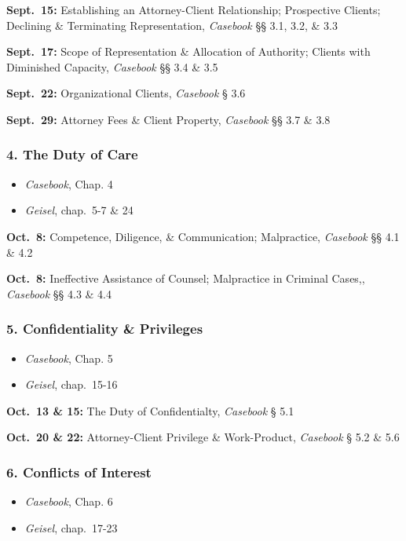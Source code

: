\documentclass[11pt,letterpaper,twoside]{article}
\providecommand{\tightlist}{%
\setlength{\itemsep}{0em}\setlength{\parskip}{0em}\setlength{\itemindent}{0em}}
\begin{document}
\textbf{Sept.~15:} Establishing an Attorney-Client Relationship;
Prospective Clients; Declining \& Terminating Representation,
\emph{Casebook} §§ 3.1, 3.2, \& 3.3

\textbf{Sept.~17:} Scope of Representation \& Allocation of Authority;
Clients with Diminished Capacity, \emph{Casebook} §§ 3.4 \& 3.5

\textbf{Sept.~22:} Organizational Clients, \emph{Casebook} § 3.6

\textbf{Sept.~29:} Attorney Fees \& Client Property, \emph{Casebook} §§
3.7 \& 3.8

\subsubsection{4. The Duty of Care}\label{the-duty-of-care}

\begin{itemize}
\tightlist
\item
  \emph{Casebook}, Chap. 4
\item
  \emph{Geisel}, chap.~5-7 \& 24
\end{itemize}

\textbf{Oct.~8:} Competence, Diligence, \& Communication; Malpractice,
\emph{Casebook} §§ 4.1 \& 4.2

\textbf{Oct.~8:} Ineffective Assistance of Counsel; Malpractice in
Criminal Cases,, \emph{Casebook} §§ 4.3 \& 4.4

\subsubsection{5. Confidentiality \&
Privileges}\label{confidentiality-privileges}

\begin{itemize}
\tightlist
\item
  \emph{Casebook}, Chap. 5
\item
  \emph{Geisel}, chap.~15-16
\end{itemize}

\textbf{Oct.~13 \& 15:} The Duty of Confidentialty, \emph{Casebook} §
5.1

\textbf{Oct.~20 \& 22:} Attorney-Client Privilege \& Work-Product,
\emph{Casebook} § 5.2 \& 5.6

\subsubsection{6. Conflicts of Interest}\label{conflicts-of-interest}

\begin{itemize}
\tightlist
\item
  \emph{Casebook}, Chap. 6
\item
  \emph{Geisel}, chap.~17-23
\end{itemize}
\end{document}
